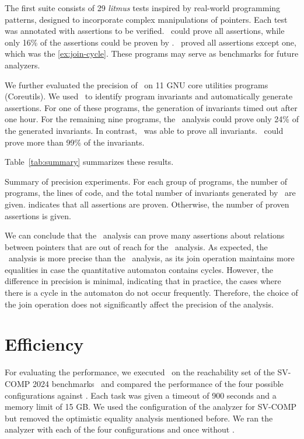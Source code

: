 The first suite consists of 29 \emph{litmus} tests inspired by real-world programming patterns,
designed to incorporate complex manipulations of pointers.
Each test was annotated with assertions to be verified.
\cpou\ could prove all assertions,
while only 16\% of the assertions could be proven by \base.
\cpod\ proved all assertions except one, which was the \cref{ex:join-cycle}.
These programs may serve as benchmarks for future analyzers.

We further evaluated the precision of \cpo\ on 11 GNU core utilities programs (Coreutils).
We used \cpou\ to identify program invariants and automatically generate assertions.
For one of these programs, the generation of invariants timed out after one hour.
For the remaining nine programs, the \base\ analysis could prove only 24\% of the generated invariants.
In contrast, \cpou\ was able to prove all invariants.
\cpod\ could prove more than 99\% of the invariants.

Table~\ref{tab:summary} summarizes these results.

\begin{table}[t]
    \centering
    \caption{Summary of precision experiments. For each group of programs, the number of programs, the lines of code, and the total number of invariants generated by \cpou\ are given.
         indicates that all assertions are proven. Otherwise, the number of proven assertions is given.}\label{tab:summary}
    
\end{table}

We can conclude that the \cpo\ analysis can prove many assertions about relations between pointers that are out of reach for the \base\ analysis.
As expected, the \cpou\ analysis is more precise than the \cpod\ analysis, as its join operation maintains more equalities in case the quantitative automaton contains cycles.
However, the difference in precision is minimal, indicating that in practice, the cases where there is a cycle in the automaton do not occur frequently.
Therefore, the choice of the join operation does not significantly affect the precision of the analysis.

\section{Efficiency}

For evaluating the performance, we executed \cpo\ on the reachability set
of the SV-COMP 2024 benchmarks~\cite{Beyer24} and compared the performance of the four possible configurations against \base.
Each task was given a timeout of 900 seconds and a memory limit of 15 GB.\@
We used the configuration of the analyzer for SV-COMP but removed the optimistic equality analysis mentioned before.
We ran the analyzer with each of the four configurations and once without \cpo.

